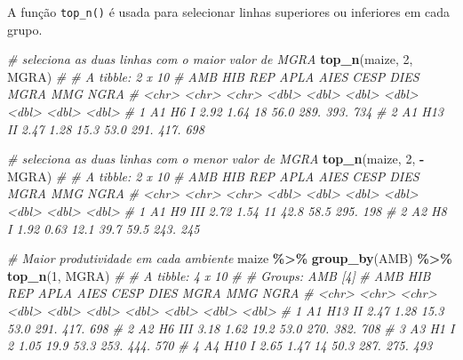 \documentclass[
]{book}
\makeatletter
\newenvironment{Shaded}{\begin{snugshade}}{\end{snugshade}}
\newcommand{\CommentTok}[1]{\textcolor[rgb]{0.56,0.35,0.01}{\textit{#1}}}
\newcommand{\DecValTok}[1]{\textcolor[rgb]{0.00,0.00,0.81}{#1}}
\newcommand{\KeywordTok}[1]{\textcolor[rgb]{0.13,0.29,0.53}{\textbf{#1}}}
\newcommand{\NormalTok}[1]{#1}
\newcommand{\OperatorTok}[1]{\textcolor[rgb]{0.81,0.36,0.00}{\textbf{#1}}}
\newcommand{\StringTok}[1]{\textcolor[rgb]{0.31,0.60,0.02}{#1}}
\numberwithin{equation}{section}
\newcommand{\indf}[1]{\index[function]{#1@\texttt{#1()}|ST}}
\makeatother
\begin{document}
A função \texttt{top\_n()}\indf{top\_n} é usada para selecionar linhas superiores ou inferiores em cada grupo.

\begin{Shaded}
\begin{Highlighting}[]
\CommentTok{\# seleciona as duas linhas com o maior valor de MGRA}
\KeywordTok{top\_n}\NormalTok{(maize, }\DecValTok{2}\NormalTok{, MGRA)}
\CommentTok{\# \# A tibble: 2 x 10}
\CommentTok{\#   AMB   HIB   REP    APLA  AIES  CESP  DIES  MGRA   MMG  NGRA}
\CommentTok{\#   \textless{}chr\textgreater{} \textless{}chr\textgreater{} \textless{}chr\textgreater{} \textless{}dbl\textgreater{} \textless{}dbl\textgreater{} \textless{}dbl\textgreater{} \textless{}dbl\textgreater{} \textless{}dbl\textgreater{} \textless{}dbl\textgreater{} \textless{}dbl\textgreater{}}
\CommentTok{\# 1 A1    H6    I      2.92  1.64  18    56.0  289.  393.   734}
\CommentTok{\# 2 A1    H13   II     2.47  1.28  15.3  53.0  291.  417.   698}

\CommentTok{\# seleciona as duas linhas com o menor valor de MGRA}
\KeywordTok{top\_n}\NormalTok{(maize, }\DecValTok{2}\NormalTok{, }\OperatorTok{{-}}\NormalTok{MGRA)}
\CommentTok{\# \# A tibble: 2 x 10}
\CommentTok{\#   AMB   HIB   REP    APLA  AIES  CESP  DIES  MGRA   MMG  NGRA}
\CommentTok{\#   \textless{}chr\textgreater{} \textless{}chr\textgreater{} \textless{}chr\textgreater{} \textless{}dbl\textgreater{} \textless{}dbl\textgreater{} \textless{}dbl\textgreater{} \textless{}dbl\textgreater{} \textless{}dbl\textgreater{} \textless{}dbl\textgreater{} \textless{}dbl\textgreater{}}
\CommentTok{\# 1 A1    H9    III    2.72  1.54  11    42.8  58.5  295.   198}
\CommentTok{\# 2 A2    H8    I      1.92  0.63  12.1  39.7  59.5  243.   245}

\CommentTok{\# Maior produtividade em cada ambiente}
\NormalTok{maize }\OperatorTok{\%\textgreater{}\%}
\StringTok{  }\KeywordTok{group\_by}\NormalTok{(AMB) }\OperatorTok{\%\textgreater{}\%}
\StringTok{  }\KeywordTok{top\_n}\NormalTok{(}\DecValTok{1}\NormalTok{, MGRA)}
\CommentTok{\# \# A tibble: 4 x 10}
\CommentTok{\# \# Groups:   AMB [4]}
\CommentTok{\#   AMB   HIB   REP    APLA  AIES  CESP  DIES  MGRA   MMG  NGRA}
\CommentTok{\#   \textless{}chr\textgreater{} \textless{}chr\textgreater{} \textless{}chr\textgreater{} \textless{}dbl\textgreater{} \textless{}dbl\textgreater{} \textless{}dbl\textgreater{} \textless{}dbl\textgreater{} \textless{}dbl\textgreater{} \textless{}dbl\textgreater{} \textless{}dbl\textgreater{}}
\CommentTok{\# 1 A1    H13   II     2.47  1.28  15.3  53.0  291.  417.   698}
\CommentTok{\# 2 A2    H6    III    3.18  1.62  19.2  53.0  270.  382.   708}
\CommentTok{\# 3 A3    H1    I      2     1.05  19.9  53.3  253.  444.   570}
\CommentTok{\# 4 A4    H10   I      2.65  1.47  14    50.3  287.  275.   493}
\end{Highlighting}
\end{Shaded}
\end{document}
